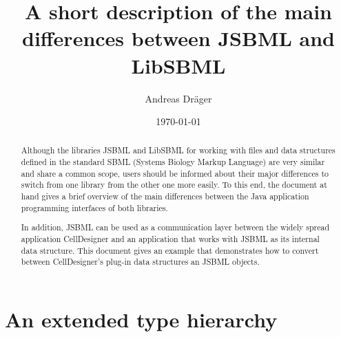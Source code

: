 \documentclass[
  letterpaper,
  11pt,
  headsepline,
  pointlessnumbers,
  tablecaptionabove,
  headinclude,
  appendixprefix,
  idxtotoc,
  bibtotoc,
  titlepage
]{scrartcl}
\title{A short description of the main differences between JSBML and LibSBML}
\author{Andreas Dr\"ager}
\date{\today}
\begin{document}
\maketitle
\tableofcontents

\begin{abstract}
Although the libraries JSBML and LibSBML for working with files and data
structures defined in the standard SBML (Systems Biology Markup Language) are
very similar and share a common scope, users should be informed about their
major differences to switch from one library from the other one more easily. To
this end, the document at hand gives a brief overview of the main differences
between the Java\texttrademark{} application programming interfaces of both
libraries.

In addition, JSBML can be used as a communication layer between the widely
spread application CellDesigner and an application that works with JSBML as its
internal data structure. This document gives an example that demonstrates how to
convert between CellDesigner's plug-in data structures an JSBML objects.
\end{abstract}

\section{An extended type hierarchy}
\end{document}
